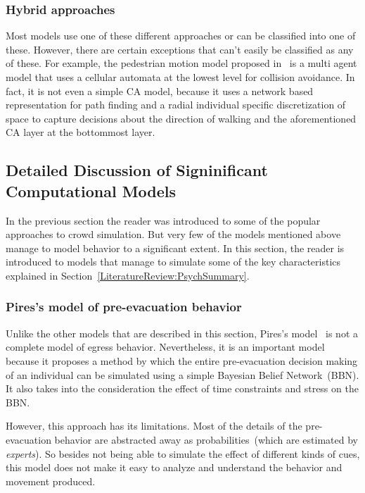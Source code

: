 \subsubsection{Hybrid approaches}
Most models use one of these different approaches or can be classified into one of these. However, there are certain exceptions that can't easily be classified as any of these. For example, the pedestrian motion model proposed in~\cite{Bierlaire:2003uj} is a multi agent model that uses a cellular automata at the lowest level for collision avoidance. In fact, it is not even a simple CA model, because it uses a network based representation for path finding and a radial individual specific discretization of space to capture decisions about the direction of walking and the aforementioned CA layer at the bottommost layer.

\subsection{Detailed Discussion of Signinificant Computational Models}
\label{LiteratureReview:DetailedModels}

In the previous section the reader was introduced to some of the popular approaches to crowd simulation. But very few of the models mentioned above manage to model behavior to a significant extent. In this section, the reader is introduced to models that manage to simulate some of the key characteristics explained in Section~\ref{LiteratureReview:PsychSummary}.

\subsubsection{Pires's model of pre-evacuation behavior}
Unlike the other models that are described in this section, Pires's model~\cite{Pires:2005gs} is not a complete model of egress behavior. Nevertheless, it is an important model because it proposes a method by which the entire pre-evacuation decision making of an individual can be simulated using a simple Bayesian Belief Network~(BBN). It also takes into the consideration the effect of time constraints and stress on the BBN.

However, this approach has its limitations. Most of the details of the pre-evacuation behavior are abstracted away as probabilities~(which are estimated by \emph{experts}). So besides not being able to simulate the effect of different kinds of cues, this model does not make it easy to analyze and understand the behavior and movement produced.

